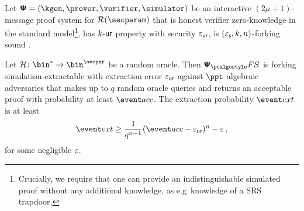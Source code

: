 \documentclass[runningheads,10pt]{llncs}
\begin{document}
\begin{theorem}
  \label{thm:se}
  Let $\ps = (\kgen, \prover, \verifier, \simulator)$ be an interactive
  $(2 \mu + 1)$-message proof system for $\RELGEN(\secparam)$ that is honest
  verifier zero-knowledge in the standard model\footnote{Crucially, we require
    that one can provide an indistinguishable simulated proof without any
    additional knowledge, as e.g~knowledge of a SRS trapdoor.}, has ${k\text{-}\mathsf{ur}}$
  property with security $\varepsilon_{\mathsf{ur}}$, is $(\varepsilon_{\mathsf{s}}, k, n)$-forking sound .

Let $\ro\colon \bin^{*} \to \bin^{\secpar}$ be a random oracle. 
Then $\psfs$ is forking simulation-extractable with extraction error $\varepsilon_{\mathsf{ur}}$
against $\ppt$ algebraic adversaries that makes up to $q$ random oracle queries and
returns an acceptable proof with probability at least $\accProb$. 
The extraction probability $\extProb$ is at least
\[
	\extProb \geq \frac{1}{q^{n - 1}} (\accProb - \epsur)^{n} -\eps\,,
\]
for some negligible $\varepsilon$.	
\end{theorem}
\end{document}
